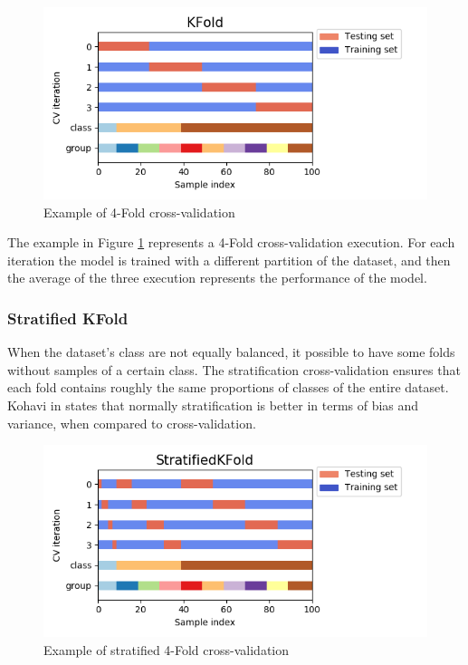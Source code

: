\begin{figure}[!h]
	\centering
	\includegraphics[width=1.0\columnwidth]{kfold2}
	\caption{Example of 4-Fold cross-validation}
	\label{fig:kfold}
\end{figure}

The example in Figure \ref{fig:kfold} represents a 4-Fold cross-validation execution. For each iteration the model is trained with a different partition of the dataset, and then the average of the three execution represents the performance of the model.

\subsubsection{Stratified KFold}

When the dataset's class are not equally balanced, it possible to have some folds without samples of a certain class. The stratification cross-validation ensures that each fold contains roughly the same proportions of classes of the entire dataset. Kohavi in \cite{kohavi1995study} states that normally stratification is better in terms of bias and variance, when compared to cross-validation.

\begin{figure}[!h]
	\centering
	\includegraphics[width=1.0\columnwidth]{stratified}
	\caption{Example of stratified 4-Fold cross-validation}
	\label{fig:stratified}
\end{figure}

